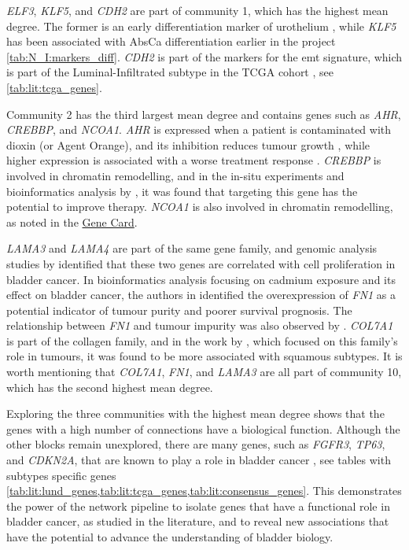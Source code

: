 \textit{ELF3}, \textit{KLF5}, and \textit{CDH2} are part of community 1, which has the highest mean degree. The former is an early differentiation marker of urothelium \citep{Bock2014-zy}, while \textit{KLF5} has been associated with AbsCa differentiation earlier in the project \cref{tab:N_I:markers_diff}. \textit{CDH2} is part of the markers for the \acrfull{emt} signature, which is part of the Luminal-Infiltrated subtype in the TCGA cohort \citep{Robertson2017-mg}, see \cref{tab:lit:tcga_genes}.

Community 2 has the third largest mean degree and contains genes such as \textit{AHR}, \textit{CREBBP}, and \textit{NCOA1}. \textit{AHR} is expressed when a patient is contaminated with dioxin (or Agent Orange), and its inhibition reduces tumour growth \citep{d}, while higher expression is associated with a worse treatment response \citep{Ma2023-uu}. \textit{CREBBP} is involved in chromatin remodelling, and in the in-situ experiments and bioinformatics analysis by \citep{Duex2018-qg}, it was found that targeting this gene has the potential to improve therapy. \textit{NCOA1} is also involved in chromatin remodelling, as noted in the \href{https://www.uniprot.org/uniprotkb/Q15788/entry#function}{Gene Card}.

\textit{LAMA3} and \textit{LAMA4} are part of the same gene family, and genomic analysis studies by \citep{Ma2024-xc} identified that these two genes are correlated with cell proliferation in bladder cancer. In bioinformatics analysis focusing on cadmium exposure and its effect on bladder cancer, the authors in \citep{Zhang2023-ul} identified the overexpression of \textit{FN1} as a potential indicator of tumour purity and poorer survival prognosis. The relationship between \textit{FN1} and tumour impurity was also observed by \citep{Zhang2023-kv}. \textit{COL7A1} is part of the collagen family, and in the work by \citep{Guo2023-sf}, which focused on this family's role in tumours, it was found to be more associated with squamous subtypes. It is worth mentioning that \textit{COL7A1}, \textit{FN1}, and \textit{LAMA3} are all part of community 10, which has the second highest mean degree.


Exploring the three communities with the highest mean degree shows that the genes with a high number of connections have a biological function. Although the other blocks remain unexplored, there are many genes, such as \textit{FGFR3}, \textit{TP63}, and \textit{CDKN2A}, that are known to play a role in bladder cancer \cite{Robertson2017-mg,Kamoun2020-tj,Marzouka2018-ge}, see tables with subtypes specific genes \cref{tab:lit:lund_genes,tab:lit:tcga_genes,tab:lit:consensus_genes}. This demonstrates the power of the network pipeline to isolate genes that have a functional role in bladder cancer, as studied in the literature, and to reveal new associations that have the potential to advance the understanding of bladder biology.


